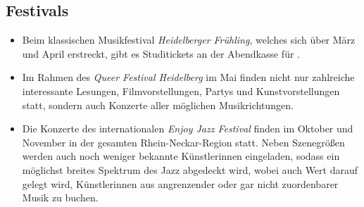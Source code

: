 \subsection{Festivals}

\begin{itemize}
\item Beim klassischen Musikfestival \emph{Heidelberger Frühling}, welches sich über März und April erstreckt, gibt es Studitickets an der Abendkasse für .
\item Im Rahmen des \emph{Queer Festival Heidelberg} im Mai finden nicht nur zahlreiche interessante Lesungen, Filmvorstellungen, Partys und Kunstvorstellungen statt, sondern auch Konzerte aller möglichen Musikrichtungen.
\item Die Konzerte des internationalen \emph{Enjoy Jazz Festival} finden im Oktober und November in der gesamten Rhein-Neckar-Region statt. Neben Szenegrößen werden auch noch weniger bekannte Künstlerinnen eingeladen, sodass ein möglichst breites Spektrum des Jazz abgedeckt wird, wobei auch Wert darauf gelegt wird, Künstlerinnen aus angrenzender oder gar nicht zuordenbarer Musik zu buchen.
\end{itemize}
